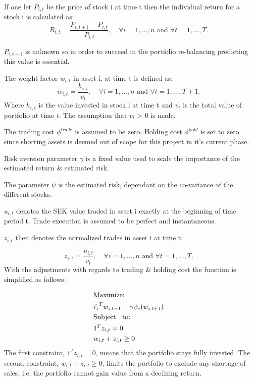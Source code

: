 \documentclass[final]{LTHtwocol} %
\begin{document}

If one let ${P_{i,t}}$ be the price of stock i at time t then the individual return for a stock i is calculated as:
$$
R_{i,t} = \frac{P_{i,t+1}-P_{i,t}}{P_{i,t}}, \quad \forall i=1,\ldots,n \text{ and } \forall t = 1,\ldots,T.
$$

$P_{i,t+1}$ is unknown so in order to succeed in the portfolio re-balancing predicting this value is essential.

The weight factor $w_{i,t}$ in asset i, at time t is defined as:
$$
w_{i,t} = \frac{h_{i,t}}{v_{t}}, \quad \forall i=1,\ldots,n \text{ and } \forall t = 1,\ldots,T+1.
$$
Where $h_{i,t}$ is the value invested in stock i at time t and $v_{t}$ is the total value of portfolio at time t. The assumption that $v_{t}$ > 0  is made.

The trading cost $\phi^{trade}$ is assumed to be zero. Holding cost $\phi^{hold}$ is set to zero since shorting assets is deemed out of scope for this project in it's current phase.

Risk aversion parameter $\gamma$ is a fixed value used to scale the importance of the estimated return \& estimated risk.

The parameter $\psi$ is the estimated risk, dependant on the co-variance of the different stocks. 

 $u_{i,t}$ denotes the SEK value traded in asset i exactly at the beginning of time period t. Trade execution is assumed to be perfect and instantaneous.

$z_{i,t}$ then denotes the normalized trades in asset i at time t:

$$
z_{i,t} = \frac{u_{i,t}}{v_{t}}, \quad \forall i=1,\ldots,n \text{ and } \forall t = 1,\ldots,T.
$$
With the adjustments with regards to trading \& holding cost the function is simplified as follows: 

\begin{equation}
 \begin{split}
 &\text{Maximize:}\\
 &\hat{r_i }^T w_{i,t+1}  -\gamma\psi_i(w_{i,t+1}) \\
&\text{Subject \: to:} \\
&1^{T}z_{i,t} = 0\\
&w_{i,t}+z_{i,t} \geq 0
\end{split}
\end{equation}
The first constraint, $1^{T}z_{i,t} = 0$, means that the portfolio stays fully invested. The second constraint, $w_{i,t}+z_{i,t} \geq 0$, limits the portfolio to exclude any shortage of sales, i.e. the portfolio cannot gain value from a declining return. \cite{Boyd}
\end{document}
